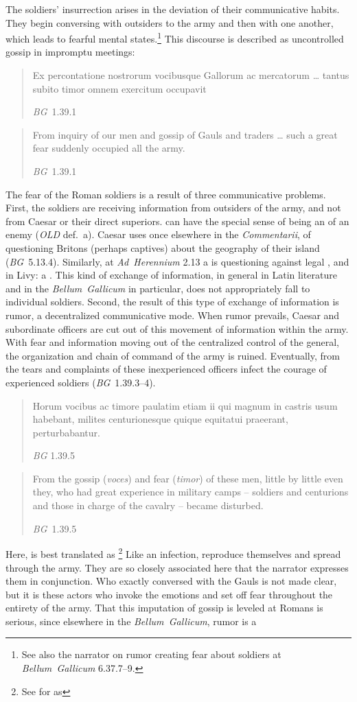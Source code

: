\documentclass[12pt,letterpaper,oneside,final]{memoir}
\begin{document}
The soldiers' insurrection arises in the deviation of their communicative habits. They begin conversing with outsiders to the army and then with one another, which leads to fearful mental states.\footnote{See also the narrator on rumor creating fear about soldiers at \emph{Bellum~Gallicum} 6.37.7--9.} This discourse is described as uncontrolled gossip in impromptu meetings: \blockquote[\emph{BG}~1.39.1]{\textlatin{Ex percontatione nostrorum vocibusque Gallorum ac mercatorum \ldots{} tantus subito timor omnem exercitum occupavit}}. \blockquote[\emph{BG}~1.39.1]{From inquiry of our men and gossip of Gauls and traders \ldots{} such a great fear suddenly occupied all the army.} The fear of the Roman soldiers is a result of three communicative problems. First, the soldiers are receiving information from outsiders of the army, and not from Caesar or their direct superiors.  can have the special sense of being an  of an enemy (\emph{OLD} def.~a). Caesar uses  once elsewhere in the \emph{Commentarii}, of questioning Britons (perhaps captives) about the geography of their island (\emph{BG}~5.13.4). Similarly, at \emph{Ad~Herennium} 2.13 a  is questioning against legal , and in Livy: a . This kind of exchange of information, in general in Latin literature and in the \emph{Bellum~Gallicum} in particular, does not appropriately fall to individual soldiers. Second, the result of this type of exchange of information is rumor, a decentralized communicative mode. When rumor prevails, Caesar and subordinate officers are cut out of this movement of information within the army. With fear and information moving out of the centralized control of the general, the organization and chain of command of the army is ruined. Eventually, from the tears and complaints of these inexperienced officers infect the courage of experienced soldiers (\emph{BG}~1.39.3--4). \blockquote[\emph{BG} 1.39.5]{\textlatin{Horum vocibus ac timore paulatim etiam ii qui magnum in castris usum habebant, milites centurionesque quique equitatui praeerant, perturbabantur.}} \blockquote[\emph{BG}~1.39.5]{From the gossip (\emph{voces}) and fear (\emph{timor}) of these men, little by little even they, who had great experience in military camps -- soldiers and centurions and those in charge of the cavalry -- became disturbed.} Here,  is best translated as \footnote{See \textcite{kranerdittenbergermeusel1967} for  as } Like an infection,  reproduce themselves and spread through the army. They are so closely associated here that the narrator expresses them in conjunction. Who exactly conversed with the Gauls is not made clear, but it is these actors who invoke the emotions and set off fear throughout the entirety of the army. That this imputation of gossip is leveled at Romans is serious, since elsewhere in the \emph{Bellum~Gallicum}, rumor is a 
\end{document}
